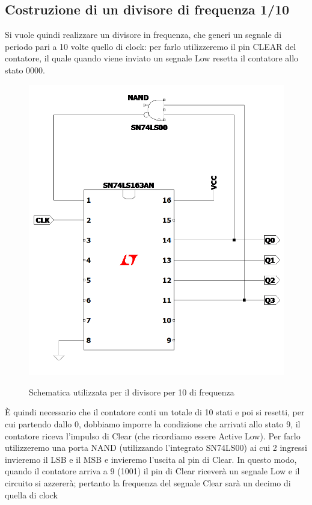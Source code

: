 \documentclass[10pt, a4paper, italian]{article}
\begin{document}
\subsection{Costruzione di un divisore di frequenza 1/10}
Si vuole quindi realizzare un divisore in frequenza, che generi un segnale di periodo pari a 10 volte quello di clock: per farlo utilizzeremo il pin CLEAR del contatore, il quale quando viene inviato un segnale Low resetta il contatore allo stato 0000.
\begin{figure}[htbp]
\centering
	\includegraphics[width=\textwidth]{Draft1}
	\label{schem: 10_div}
	\caption{Schematica utilizzata per il divisore per 10 di frequenza}
\end{figure}
È quindi necessario che il contatore conti un totale di 10 stati e poi si resetti, per cui partendo dallo 0, dobbiamo imporre la condizione che arrivati allo stato 9, il contatore riceva l'impulso di Clear (che ricordiamo essere Active Low).
Per farlo utilizzeremo una porta NAND (utilizzando l'integrato SN74LS00) ai cui 2 ingressi invieremo il LSB e il MSB e invieremo l'uscita al pin di Clear. In questo modo, quando il contatore arriva a 9 (1001) il pin di Clear riceverà un segnale Low e il circuito si azzererà; pertanto la frequenza del segnale Clear sarà un decimo di quella di clock
\end{document}
